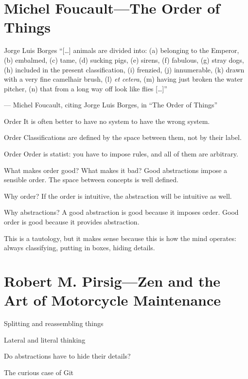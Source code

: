\documentclass[aspectratio=169]{beamer}
\begin{document}
  \section{Michel Foucault—The Order of Things}
  \begin{frame}{Jorge Luis Borges}
    “[\ldots] animals are divided into: (a) belonging to the Emperor, (b)
    embalmed, (c) tame, (d) sucking pigs, (e) sirens, (f) fabulous, (g) stray
    dogs, (h) included in the present classification, (i) frenzied, (j)
    innumerable, (k) drawn with a very fine camelhair brush, (l) \textit{et
    cetera}, (m) having just broken the water pitcher, (n) that from a long
    way off look like flies [\ldots]”

    — Michel Foucault, citing Jorge Luis Borges, in “The Order of Things”
  \end{frame}
  \begin{frame}{Order}
    It is often better to have no system to have the wrong system.
  \end{frame}
  \begin{frame}{Order}
    Classifications are defined by the space between them, not by their label.
  \end{frame}
  \begin{frame}{Order}
    Order is statist: you have to impose rules, and all of them are arbitrary.
  \end{frame}
  \begin{frame}{What makes order good? What makes it bad?}
    Good abstractions impose a sensible order. The space between concepts is
    well defined.
  \end{frame}
  \begin{frame}{Why order?}
    If the order is intuitive, the abstraction will be intuitive as well.
  \end{frame}
  \begin{frame}{Why abstractions?}
    A good abstraction is good because it imposes order. Good order is good
    because it provides abstraction.

    This is a tautology, but it makes sense because this is how the mind
    operates: always classifying, putting in boxes, hiding details.
  \end{frame}
  \section{Robert M. Pirsig—Zen and the Art of Motorcycle Maintenance}
  \begin{frame}{Splitting and reassembling things}
  \end{frame}
  \begin{frame}{Lateral and literal thinking}
  \end{frame}
  \begin{frame}{Do abstractions have to hide their details?}
  \end{frame}
  \begin{frame}{The curious case of Git}
  \end{frame}
\end{document}
